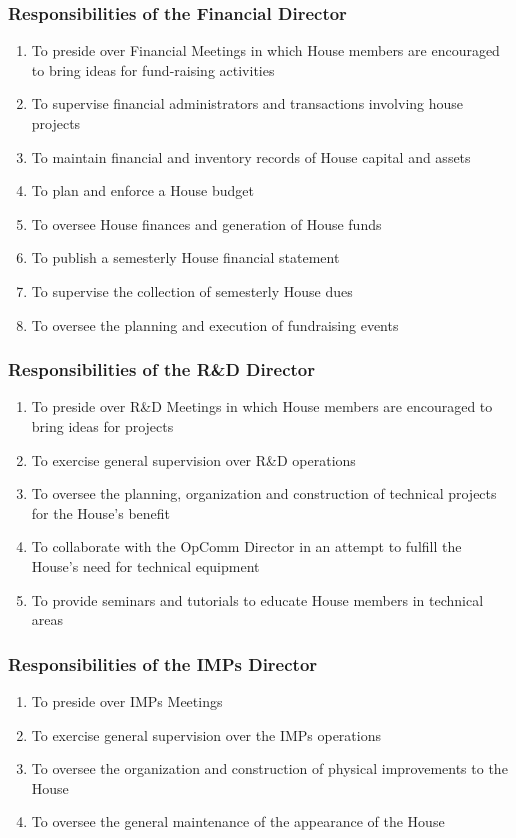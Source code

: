 \documentclass{article}
\newcommand{\asubsection}[1]{\subsubsection{#1} \label{#1}}
\begin{document}
\asubsection{Responsibilities of the Financial Director}
\begin{enumerate}
	\item To preside over Financial Meetings in which House members are encouraged to bring ideas for fund-raising activities
	\item To supervise financial administrators and transactions involving house projects
	\item To maintain financial and inventory records of House capital and assets
	\item To plan and enforce a House budget
	\item To oversee House finances and generation of House funds
	\item To publish a semesterly House financial statement
	\item To supervise the collection of semesterly House dues
	\item To oversee the planning and execution of fundraising events
\end{enumerate}

\subsubsection{Responsibilities of the R\&D Director}
\begin{enumerate}
	\item To preside over R\&D Meetings in which House members are encouraged to bring ideas for projects
	\item To exercise general supervision over R\&D operations
	\item To oversee the planning, organization and construction of technical projects for the House's benefit
	\item To collaborate with the OpComm Director in an attempt to fulfill the House's need for technical equipment
	\item To provide seminars and tutorials to educate House members in technical areas
\end{enumerate}

\asubsection{Responsibilities of the IMPs Director}
\begin{enumerate}
	\item To preside over IMPs Meetings
	\item To exercise general supervision over the IMPs operations
	\item To oversee the organization and construction of physical improvements to the House
	\item To oversee the general maintenance of the appearance of the House
\end{enumerate}
\end{document}
